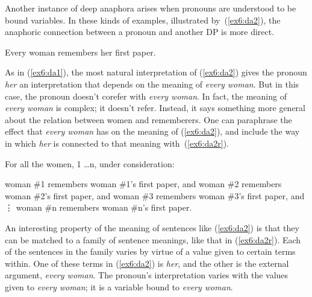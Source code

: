 Another instance of deep anaphora arises when pronouns are understood to be bound variables. In these kinds of examples, illustrated by~(\ref{ex6:da2}), the anaphoric connection between a pronoun and another DP is more direct.
\begin{exe}
	\raggedright
	\ex \label{ex6:da2}
	Every woman remembers her first paper.
\end{exe}
As in (\ref{ex6:da1}), the most natural interpretation of (\ref{ex6:da2}) gives the pronoun \emph{her} an interpretation that depends on the meaning of \emph{every woman}. But in this case, the pronoun doesn't corefer with \emph{every woman}. In fact, the meaning of \emph{every woman} is complex; it doesn't refer. %
%
%
%
Instead, it says something more general about the relation between women and rememberers. One can paraphrase the effect that \emph{every woman} has on the meaning of (\ref{ex6:da2}), and include the way in which \emph{her} is connected to that meaning with~(\ref{ex6:da2r}).
\begin{exe}
	\raggedright
	\ex \label{ex6:da2r}
	For all the women, 1 \ldots n, under consideration:
	\begin{xlist}
		\ex woman \#1 remembers woman \#1's first paper, and
		\ex woman \#2 remembers woman \#2's first paper, and
		\ex woman \#3 remembers woman \#3's first paper, and
		\sn \hspace*{1.25in}\vdots
		\ex woman \#n remembers woman \#n's first paper.
	\end{xlist}
\end{exe}
An interesting property of the meaning of sentences like (\ref{ex6:da2}) is that they can be matched to a family of sentence meanings, like that in (\ref{ex6:da2r}). Each of the sentences in the family varies by virtue of a value given to certain terms within. One of these terms in (\ref{ex6:da2}) is \emph{her}, and the other is the external argument, \emph{every woman}. The pronoun's interpretation varies with the values given to \emph{every woman}; it is a variable bound to \emph{every woman}.

